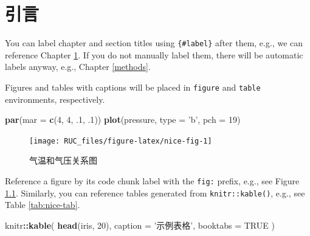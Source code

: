 \documentclass[a4paper,bachelor]{ructhesis}
\newenvironment{Shaded}{\begin{snugshade}}{\end{snugshade}}
\newcommand{\KeywordTok}[1]{\textcolor[rgb]{0.13,0.29,0.53}{\textbf{#1}}}
\newcommand{\DataTypeTok}[1]{\textcolor[rgb]{0.13,0.29,0.53}{#1}}
\newcommand{\DecValTok}[1]{\textcolor[rgb]{0.00,0.00,0.81}{#1}}
\newcommand{\FloatTok}[1]{\textcolor[rgb]{0.00,0.00,0.81}{#1}}
\newcommand{\StringTok}[1]{\textcolor[rgb]{0.31,0.60,0.02}{#1}}
\newcommand{\OtherTok}[1]{\textcolor[rgb]{0.56,0.35,0.01}{#1}}
\newcommand{\OperatorTok}[1]{\textcolor[rgb]{0.81,0.36,0.00}{\textbf{#1}}}
\newcommand{\NormalTok}[1]{#1}
\theoremstyle{definition}
\theoremstyle{definition}
\theoremstyle{definition}
\theoremstyle{remark}
\begin{document}
\hypertarget{intro}{%
\chapter{引言}\label{intro}}

You can label chapter and section titles using \texttt{\{\#label\}}
after them, e.g., we can reference Chapter \ref{intro}. If you do not
manually label them, there will be automatic labels anyway, e.g.,
Chapter \ref{methods}.

Figures and tables with captions will be placed in \texttt{figure} and
\texttt{table} environments, respectively.

\begin{Shaded}
\begin{Highlighting}[]
\KeywordTok{par}\NormalTok{(}\DataTypeTok{mar =} \KeywordTok{c}\NormalTok{(}\DecValTok{4}\NormalTok{, }\DecValTok{4}\NormalTok{, }\FloatTok{.1}\NormalTok{, }\FloatTok{.1}\NormalTok{))}
\KeywordTok{plot}\NormalTok{(pressure, }\DataTypeTok{type =} \StringTok{'b'}\NormalTok{, }\DataTypeTok{pch =} \DecValTok{19}\NormalTok{)}
\end{Highlighting}
\end{Shaded}

\begin{figure}

{\centering \texttt{[image: RUC\_files/figure-latex/nice-fig-1]} 

}

\caption{气温和气压关系图}\label{fig:nice-fig}
\end{figure}

Reference a figure by its code chunk label with the \texttt{fig:}
prefix, e.g., see Figure \ref{fig:nice-fig}. Similarly, you can
reference tables generated from \texttt{knitr::kable()}, e.g., see Table
\ref{tab:nice-tab}.

\begin{Shaded}
\begin{Highlighting}[]
\NormalTok{knitr}\OperatorTok{::}\KeywordTok{kable}\NormalTok{(}
  \KeywordTok{head}\NormalTok{(iris, }\DecValTok{20}\NormalTok{), }\DataTypeTok{caption =} \StringTok{'示例表格'}\NormalTok{,}
  \DataTypeTok{booktabs =} \OtherTok{TRUE}
\NormalTok{)}
\end{Highlighting}
\end{Shaded}
\end{document}
